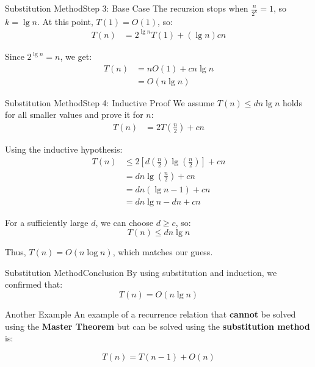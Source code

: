 \documentclass[aspectratio=169]{beamer}
\begin{document}
\begin{frame}{Substitution Method}{Step 3: Base Case}
    The recursion stops when $\frac{n}{2^k} = 1$, so $k = \lg n$. At this point, $T(1) = O(1)$, so:
    \begin{align*}
    T(n) &= 2^{\lg n} T(1) + (\lg n)cn
    \end{align*}

    Since $2^{\lg n} = n$, we get:
    \begin{align*}
    T(n) &= n O(1) + cn \lg n \\
        &= O(n \lg n)
    \end{align*}
\end{frame}

\begin{frame}{Substitution Method}{Step 4: Inductive Proof}
    \footnotesize
    We assume $T(n) \leq dn \lg n$ holds for all smaller values and prove it for $n$:
    \begin{align*}
    T(n) &= 2T\left(\frac{n}{2}\right) + cn
    \end{align*}

    Using the inductive hypothesis:
    \begin{align*}
    T(n) &\leq 2 \left[ d \left(\frac{n}{2}\right) \lg \left(\frac{n}{2}\right) \right] + cn \\
        &= d n \lg \left( \frac{n}{2} \right) + cn \\
        &= d n (\lg n - 1) + cn \\
        &= d n \lg n - d n + cn
    \end{align*}

    For a sufficiently large $d$, we can choose $d \geq c$, so:
    \begin{equation*}
    T(n) \leq d n \lg n
    \end{equation*}

    Thus, $T(n) = O(n \log n)$, which matches our guess.
\end{frame}

\begin{frame}{Substitution Method}{Conclusion}
    By using substitution and induction, we confirmed that:
    \begin{equation*}
    T(n) = O(n \lg n)
    \end{equation*}
\end{frame}

\begin{frame}{Another Example}
    An example of a recurrence relation that \textbf{cannot} be solved using the \textbf{Master Theorem} but can be solved using the \textbf{substitution method} is:

    $$
        T(n) = T(n-1) + O(n)
    $$
\end{frame}
\end{document}
